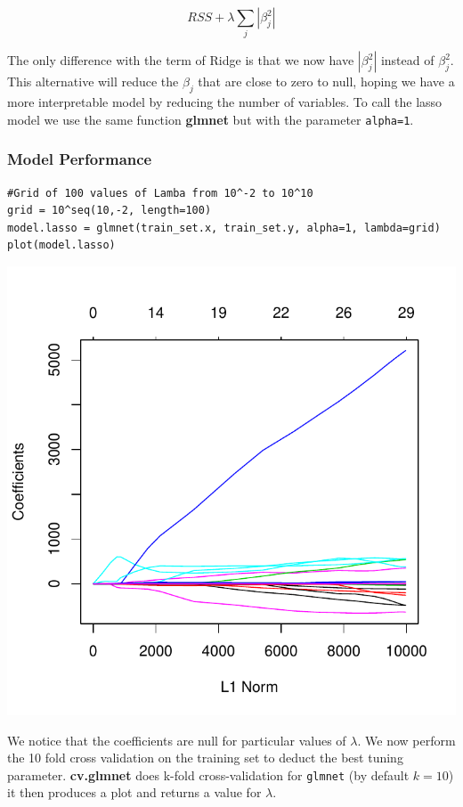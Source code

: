 \documentclass[]{report}
\begin{document}
\begin{equation} \label{eq2}
RSS + \lambda \sum_{j}{|\beta_{j}^{2}|}
\end{equation}	

The only difference with the term of Ridge is that we now have $|\beta_{j}^{2}|$ instead of $\beta_{j}^{2}$. This alternative will reduce the $\beta_{j}$ that are close to zero to null, hoping we have a more interpretable model by reducing the number of variables. To call the lasso model we use the same function \textbf{glmnet} but with the parameter \texttt{alpha=1}.

\subsubsection{Model Performance}
\begin{lstlisting}
#Grid of 100 values of Lamba from 10^-2 to 10^10
grid = 10^seq(10,-2, length=100)
model.lasso = glmnet(train_set.x, train_set.y, alpha=1, lambda=grid)
plot(model.lasso)
\end{lstlisting}

\begin{center}
	\includegraphics[width=0.8\linewidth]{Figures/lasso_model.pdf}
\end{center}

We notice that the coefficients are null for particular values of $\lambda$. We now perform the 10 fold cross validation on the training set to deduct the best tuning parameter. \textbf{cv.glmnet} does k-fold cross-validation for \texttt{glmnet} (by default $k=10$) it then  produces a plot and returns a value for $\lambda$.
\end{document}
